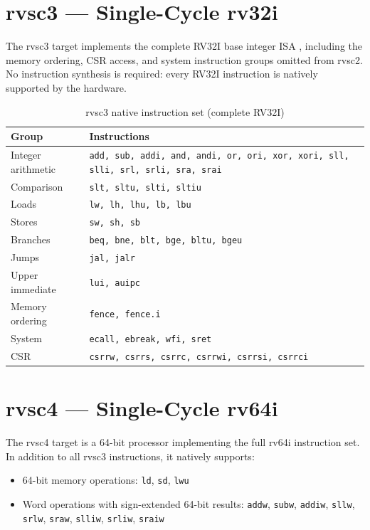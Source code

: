 \section{rvsc3 --- Single-Cycle rv32i}

The rvsc3 target implements the complete RV32I base integer ISA \cite{riscv-spec}, including the
memory ordering, CSR access, and system instruction groups omitted from rvsc2. No instruction
synthesis is required: every RV32I instruction is natively supported by the hardware.

\begin{table}[htb]
\centering
\caption{rvsc3 native instruction set (complete RV32I)}
\label{tab:rvsc3-isa}
\begin{tabular}{lp{11.9cm}}
\toprule
\textbf{Group} & \textbf{Instructions} \\
\midrule
Integer arithmetic & \texttt{add, sub, addi, and, andi, or, ori, xor, xori, sll, slli, srl, srli, sra, srai} \\
Comparison         & \texttt{slt, sltu, slti, sltiu} \\
Loads              & \texttt{lw, lh, lhu, lb, lbu} \\
Stores             & \texttt{sw, sh, sb} \\
Branches           & \texttt{beq, bne, blt, bge, bltu, bgeu} \\
Jumps              & \texttt{jal, jalr} \\
Upper immediate    & \texttt{lui, auipc} \\
Memory ordering    & \texttt{fence, fence.i} \\
System             & \texttt{ecall, ebreak, wfi, sret} \\
CSR                & \texttt{csrrw, csrrs, csrrc, csrrwi, csrrsi, csrrci} \\
\bottomrule
\end{tabular}
\end{table}

\section{rvsc4 --- Single-Cycle rv64i}

The rvsc4 target is a 64-bit processor implementing the full rv64i instruction set. In addition to all
rvsc3 instructions, it natively supports:

\begin{itemize}
  \item 64-bit memory operations: \texttt{ld}, \texttt{sd}, \texttt{lwu}
  \item Word operations with sign-extended 64-bit results: \texttt{addw}, \texttt{subw},
        \texttt{addiw}, \texttt{sllw}, \texttt{srlw}, \texttt{sraw}, \texttt{slliw},
        \texttt{srliw}, \texttt{sraiw}
\end{itemize}

